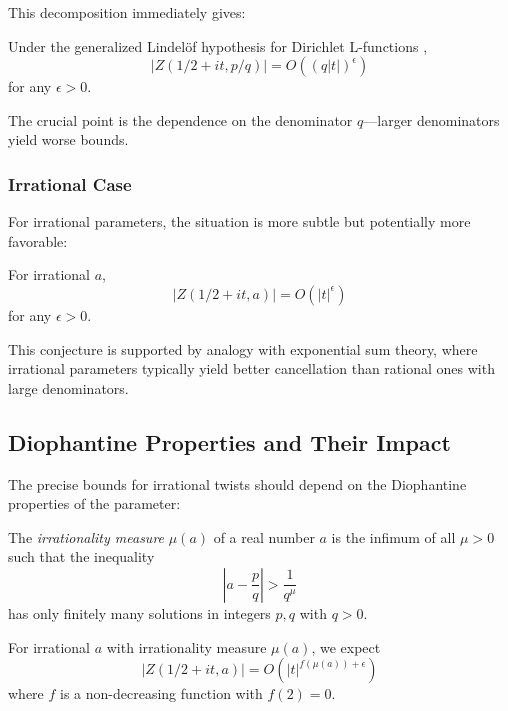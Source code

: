 This decomposition immediately gives:

\begin{corollary}
Under the generalized Lindelöf hypothesis for Dirichlet L-functions \cite{soundararajan2008},
\begin{equation}
|Z(1/2 + it, p/q)| = O((q|t|)^{\epsilon})
\end{equation}
for any $\epsilon > 0$.
\end{corollary}

The crucial point is the dependence on the denominator $q$---larger denominators yield worse bounds.

\subsubsection{Irrational Case}

For irrational parameters, the situation is more subtle but potentially more favorable:

\begin{conjecture}
For irrational $a$,
\begin{equation}
|Z(1/2 + it, a)| = O(|t|^{\epsilon})
\end{equation}
for any $\epsilon > 0$.
\end{conjecture}

This conjecture is supported by analogy with exponential sum theory, where irrational parameters typically yield better cancellation than rational ones with large denominators.

\subsection{Diophantine Properties and Their Impact}

The precise bounds for irrational twists should depend on the Diophantine properties of the parameter:

\begin{definition}
The \emph{irrationality measure} $\mu(a)$ of a real number $a$ is the infimum of all $\mu > 0$ such that the inequality
\begin{equation}
\left|a - \frac{p}{q}\right| > \frac{1}{q^{\mu}}
\end{equation}
has only finitely many solutions in integers $p, q$ with $q > 0$.
\end{definition}

\begin{conjecture}
For irrational $a$ with irrationality measure $\mu(a)$, we expect
\begin{equation}
|Z(1/2 + it, a)| = O(|t|^{f(\mu(a)) + \epsilon})
\end{equation}
where $f$ is a non-decreasing function with $f(2) = 0$.
\end{conjecture}

